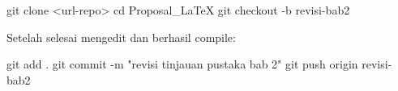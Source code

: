 \documentclass[
]{article}
\newenvironment{Shaded}{}{}
\newcommand{\AttributeTok}[1]{\textcolor[rgb]{0.49,0.56,0.16}{#1}}
\newcommand{\BuiltInTok}[1]{\textcolor[rgb]{0.00,0.50,0.00}{#1}}
\newcommand{\FunctionTok}[1]{\textcolor[rgb]{0.02,0.16,0.49}{#1}}
\newcommand{\NormalTok}[1]{#1}
\newcommand{\OperatorTok}[1]{\textcolor[rgb]{0.40,0.40,0.40}{#1}}
\newcommand{\StringTok}[1]{\textcolor[rgb]{0.25,0.44,0.63}{#1}}
\begin{document}
\begin{Shaded}
\begin{Highlighting}[]
\FunctionTok{git}\NormalTok{ clone }\OperatorTok{\textless{}}\NormalTok{url{-}repo}\OperatorTok{\textgreater{}}
\BuiltInTok{cd}\NormalTok{ Proposal\_LaTeX}
\FunctionTok{git}\NormalTok{ checkout }\AttributeTok{{-}b}\NormalTok{ revisi{-}bab2}
\end{Highlighting}
\end{Shaded}

Setelah selesai mengedit dan berhasil compile:

\begin{Shaded}
\begin{Highlighting}[]
\FunctionTok{git}\NormalTok{ add .}
\FunctionTok{git}\NormalTok{ commit }\AttributeTok{{-}m} \StringTok{"revisi tinjauan pustaka bab 2"}
\FunctionTok{git}\NormalTok{ push origin revisi{-}bab2}
\end{Highlighting}
\end{Shaded}
\end{document}
